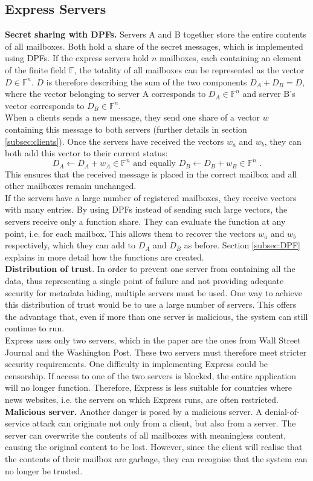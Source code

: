 \documentclass[a4paper]{article}
\begin{document}
\subsection{Express Servers} \label{subsec:server}
\textbf{Secret sharing with DPFs.}
Servers A and B together store the entire contents of all mailboxes. Both hold a share of the secret messages, which is implemented using DPFs.
If the express servers hold $n$ mailboxes, each containing an element of the finite field $\mathbb{F}$, the totality of all mailboxes can be represented as the vector $D \in \mathbb{F}^n$. 
$D$ is therefore describing the sum of the two components $D_A+ D_B =D$, where the vector belonging to server A corresponds to $D_A \in \mathbb{F}^n$ and server B's vector corresponds to $D_B \in \mathbb{F}^n$. \\
When a clients sends a new message, they send one share of a vector $w$ containing this message to both servers (further details in section \ref{subsec:clients}). 
Once the servers have received the vectors $w_a$ and $w_b$, they can both add this vector to their current status: \[ D_A \leftarrow D_A + w_A \in \mathbb{F}^n \text{ and equally } D_B \leftarrow D_B + w_B \in \mathbb{F}^n \text{ .}\]This ensures that the received message is placed in the correct mailbox and all other mailboxes remain unchanged. \\
If the servers have a large number of registered mailboxes, they receive vectors with many entries. By using DPFs instead of sending such large vectors, the servers receive only a function share. They can evaluate the function at any point, i.e. for each mailbox. This allows them to recover the vectors $w_a$ and $w_b$ respectively, which they can add to $D_A$ and $D_B$ as before. Section \ref{subsec:DPF} explains in more detail how the functions are created. 
\\ \textbf{Distribution of trust}.
In order to prevent one server from containing all the data, thus representing a single point of failure and not providing adequate security for metadata hiding, multiple servers must be used. One way to achieve this distribution of trust would be to use a large number of servers. This offers the advantage that, even if more than one server is malicious, the system can still continue to run.\\
Express uses only two servers, which in the paper are the ones from Wall Street Journal and the Washington Post. These two servers must therefore meet stricter security requirements. One difficulty in implementing Express could be censorship. If access to one of the two servers is blocked, the entire application will no longer function.  Therefore, Express is less suitable for countries where news websites, i.e. the servers on which Express runs, are often restricted. 
\\ \textbf{Malicious server.}
Another danger is posed by a malicious server. A denial-of-service attack can originate not only from a client, but also from a server. The server can overwrite the contents of all mailboxes with meaningless content, causing the original content to be lost. However, since the client will realise that the contents of their mailbox are garbage, they can recognise that the system can no longer be trusted. 
\end{document}
